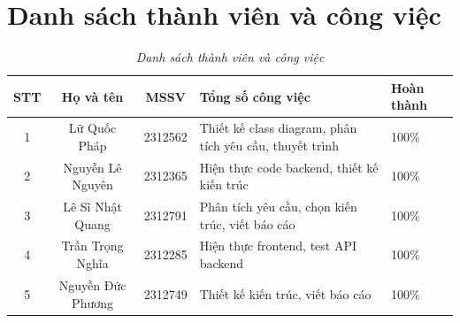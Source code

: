 \section*{Danh sách thành viên và công việc}
\begin{center}
\begin{table}[h]
\centering
\renewcommand{\arraystretch}{1.5}
\begin{tabular}{|c|c|c|p{4.5cm}|p{1.5cm}|}
\hline
\textbf{STT} & \textbf{Họ và tên} & \textbf{MSSV} & \textbf{Tổng số công việc} & \textbf{Hoàn thành}\\
\hline 
1 & Lữ Quốc Pháp & 2312562 & 
Thiết kế class diagram, phân tích yêu cầu, thuyết trình & 100\% \\
\hline
2 & Nguyễn Lê Nguyên & 2312365 & 
Hiện thực code backend, thiết kế kiến trúc & 100\% \\
\hline
3 & Lê Sĩ Nhật Quang & 2312791 & 
Phân tích yêu cầu, chọn kiến trúc, viết báo cáo & 100\% \\
\hline
4 & Trần Trọng Nghĩa & 2312285 & 
Hiện thực frontend, test API backend & 100\% \\
\hline
5 & Nguyễn Đức Phương & 2312749 & 
Thiết kế kiến trúc, viết báo cáo & 100\% \\
\hline

\end{tabular}
\caption{\label{table1}\textit{Danh sách thành viên và công việc}}
\end{table}
\end{center}

